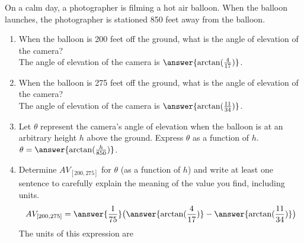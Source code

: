 \documentclass{ximera}
\author{Elizabeth Campolongo}
\begin{document}
\begin{exercise}
On a calm day, a photographer is filming a hot air balloon.  When the balloon launches, the photographer is stationed 850 feet away from the balloon.
%
\begin{enumerate}
\item When the balloon is 200 feet off the ground, what is the angle of elevation of the camera?\\
The angle of elevation of the camera is $\answer{\arctan(\frac{4}{17})}$.
%
\item When the balloon is 275 feet off the ground, what is the angle of elevation of the camera?\\
The angle of elevation of the camera is $\answer{\arctan(\frac{11}{34})}$.
%
\item Let $\theta$ represent the camera's angle of elevation when the balloon is at an arbitrary height $h$ above the ground.  Express $\theta$ as a function of $h$. \\
$\theta = \answer{\arctan(\frac{h}{850})}$.
%
\item Determine $AV_{[200,275]}$ for $\theta$ (as a function of $h$) and write at least one sentence to carefully explain the meaning of the value you find, including units.\\
%
$$AV_{[200,275]} = \answer{\frac{1}{75}}\big(\answer{\arctan(\frac{4}{17})} - \answer{\arctan(\frac{11}{34})} \big)$$
%
The units of this expression are 
%
\begin{multipleChoice}
\end{multipleChoice}
%
\end{enumerate}
\end{exercise}
\end{document}

